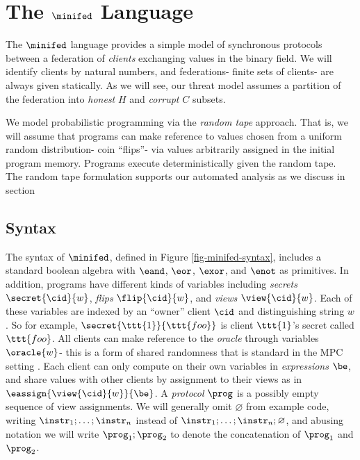 \section{The $\minifed$ Language}
\label{section-minicat}

The $\minifed$ language provides a simple model of synchronous
protocols between a federation of \emph{clients} exchanging values in
the binary field. We will identify clients by natural numbers, and
federations- finite sets of clients- are always given statically.
As we will see, our threat model assumes a partition of the federation
into \emph{honest} $H$ and \emph{corrupt} $C$ subsets.

We model probabilistic programming via the \emph{random tape}
approach. That is, we will assume that programs can make reference to
values chosen from a uniform random distribution- coin ``flips''- via
values arbitrarily assigned in the initial program memory.  Programs
execute deterministically given the random tape. The random tape
formulation supports our automated analysis as we discuss in
section 

\subsection{Syntax} The syntax of $\minifed$, defined in
Figure \ref{fig-minifed-syntax}, includes a standard boolean algebra
with $\eand$, $\eor$, $\exor$, and $\enot$ as primitives. In addition,
programs have different kinds of variables including \emph{secrets}
$\secret{\cid}{w}$, \emph{flips} $\flip{\cid}{w}$, and \emph{views}
$\view{\cid}{w}$.  Each of these variables are indexed by an ``owner''
client $\cid$ and distinguishing string $w$. So for example,
$\secret{\ttt{1}}{\ttt{foo}}$ is client $\ttt{1}$'s secret called
$\ttt{foo}$. All clients can make reference to the \emph{oracle}
through variables $\oracle{w}$- this is a form of shared randomness
that is standard in the MPC setting \cite{evans2018pragmatic}.  Each client can only
compute on their own variables in \emph{expressions} $\be$, and share
values with other clients by assignment to their views as in
$\eassign{\view{\cid}{w}}{\be}$.  A \emph{protocol} $\prog$ is a
possibly empty sequence of view assignments. We will generally omit
$\varnothing$ from example code, writing $\instr_1;\ldots;\instr_n$
instead of $\instr_1;\ldots;\instr_n;\varnothing$, and abusing notation we will
write $\prog_1;\prog_2$ to denote the concatenation of $\prog_1$
and $\prog_2$.



